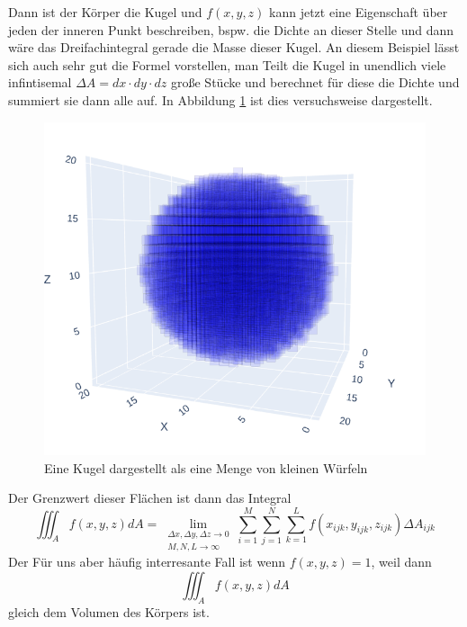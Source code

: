 \documentclass{report}
\begin{document}
{Dann ist der Körper die Kugel und $f(x,y,z)$ kann jetzt eine Eigenschaft über jeden der inneren Punkt beschreiben,
bspw. die Dichte an dieser Stelle und dann wäre das Dreifachintegral gerade die Masse dieser Kugel.\newline
An diesem Beispiel lässt sich auch sehr gut die Formel vorstellen, man Teilt die Kugel in unendlich viele infintisemal $\Delta A = dx\cdot dy\cdot dz$ große Stücke
und berechnet für diese die Dichte und summiert sie dann alle auf. In Abbildung \ref*{fig:Kugel_approximiert} ist dies versuchsweise dargestellt.
\begin{figure}[H]
    \centering
    \includegraphics*[scale=0.3]{Bilder/KugelApproximiert.png}
    \caption{Eine Kugel dargestellt als eine Menge von kleinen Würfeln}
    \label{fig:Kugel_approximiert}
    \end{figure}  
Der Grenzwert dieser Flächen ist dann das Integral
$$
\iiint_A f(x, y,z) d A=\lim _{\substack{\Delta x, \Delta y,\Delta z \rightarrow 0 \\ M, N,L \rightarrow \infty}} \sum_{i=1}^M \sum_{j=1}^N \sum_{k=1}^L f\left(x_{i j k}, y_{i j k},z_{ijk}\right) \Delta A_{i j k}
$$
Der Für uns aber häufig interresante Fall ist wenn $f(x,y,z)=1$, weil dann 
$$
\iiint_A f(x, y,z) d A
$$
gleich dem Volumen des Körpers ist.
}
\end{document}
